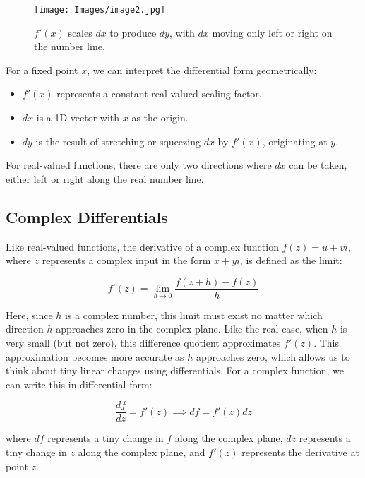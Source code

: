 \documentclass[a4paper,10.5pt]{article}
\begin{document}
\begin{figure}[htp]
    \centering
    \texttt{[image: Images/image2.jpg]}
    \caption{\( f'(x) \) scales \( dx \) to produce \( dy \), with \( dx \) moving only left or right on the number line.}
    \label{fig:galaxy}
\end{figure}

For a fixed point $x$, we can interpret the differential form geometrically:

\begin{itemize}
    \item $f'(x)$ represents a constant real-valued scaling factor.
    \item $dx$ is a 1D vector with $x$ as the origin.
    \item $dy$ is the result of stretching or squeezing $dx$ by $f'(x)$, originating at $y$.
\end{itemize}

For real-valued functions, there are only two directions where $dx$ can be taken, either left or right along the real number line.


\subsection{Complex Differentials}

Like real-valued functions, the derivative of a complex function $f(z)=u+vi$, where $z$ represents a complex input in the form $x + yi$, is defined as the limit:

\begin{equation}
    f'(z) = \lim_{h \to 0} \frac{f(z+h) - f(z)}{h}
\end{equation}

Here, since $h$ is a complex number, this limit must exist no matter which direction $h$ approaches zero in the complex plane. Like the real case, when $h$ is very small (but not zero), this difference quotient approximates $f'(z)$. This approximation becomes more accurate as $h$ approaches zero, which allows us to think about tiny linear changes using differentials. For a complex function, we can write this in differential form:

\begin{equation}
    \frac{df}{dz} = f'(z) \implies df = f'(z)dz
\end{equation}

where $df$ represents a tiny change in $f$ along the complex plane, $dz$ represents a tiny change in $z$ along the complex plane, and $f'(z)$ represents the derivative at point $z$.
\end{document}
